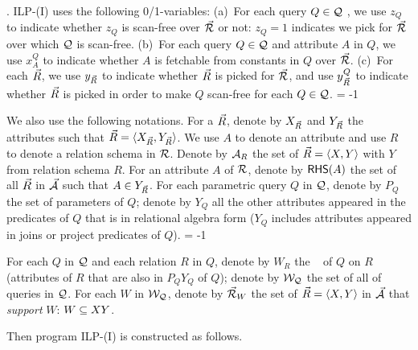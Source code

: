 {. 
ILP-(I) uses the following 0/1-variables: 
(a)~For each query $Q\in \mathcal Q$ , we use $z_{Q}$ to indicate whether
$z_{Q}$ is scan-free over $\vec{{\mathcal R}}$ or not:
$z_{Q} = 1$ indicates we pick \bss for $\vec{{\mathcal R}}$ over which $\mathcal Q$ is scan-free.
(b)~For each query $Q\in \mathcal Q$ and attribute $A$ in $Q$, we use
$x_{A}^{Q}$ to indicate whether $A$ is fetchable from constants
in $Q$ over $\vec{{\mathcal R}}$. 
(c)~For each \bs $\vec{R}$, we use $y_{\vec{R}}$ to indicate
whether $\vec{R}$ is picked for $\vec{{\mathcal R}}$, and use $y^{Q}_{\vec{R}}$ to
indicate whether $\vec{R}$ is picked in order to make $Q$ scan-free
for each $Q\in \mathcal Q$.
\looseness = -1

\vspace{0.4ex}
We also use the following notations. For a \bs $\vec{R}$,
denote by $X_{\vec{R}}$ and $Y_{\vec{R}}$ the attributes such that
$\vec{R}\allowbreak =\allowbreak  \langle X_{\vec{R}},\allowbreak Y_{\vec{R}}\rangle$.
We use $A$ to denote an attribute and use $R$ to denote a
relation schema in ${\mathcal R}$.
Denote by ${\mathcal A}_{R}$ the set of \bss $\vec{R} \allowbreak = \allowbreak
\langle X,\allowbreak Y\rangle$ with $Y$ from relation schema $R$. For an
attribute $A$ of ${\mathcal R}$, denote by ${\mathsf{RHS}}(A)$ the set of all \bss
$\vec{R}$ in $\vec{{\mathcal A}}$ such that $A\in Y_{\vec{R}}$.
%
For each parametric query $Q$ in $\mathcal Q$, denote by $P_{Q}$ the set
of parameters of $Q$; denote by $Y_{Q}$ all the other
attributes appeared in the predicates of $Q$ that is in relational
algebra form (\ie $Y_{Q}$ includes attributes appeared
in joins or project predicates of $Q$). 
\looseness = -1

For each $Q$ in $\mathcal Q$ and each relation $R$ in $Q$, denote by
$W_{R}$ the \qcs~\cite{blinkdb} of $Q$ on $R$ (\ie attributes of
$R$ that are also in $P_{Q}Y_{Q}$ of $Q$); denote by $\mathcal{W}_{\mathcal Q}$
the set of all \qcs of queries in $\mathcal Q$. For each \qcs $W$ in
$\mathcal{W}_{\mathcal Q}$, denote by $\vec{{\mathcal R}}_{W}$ the set of \bss $\vec{R}\allowbreak
=\allowbreak \langle X,\allowbreak Y\rangle$ in $\vec{{\mathcal A}}$ that {\em support} $W$: $W\allowbreak\subseteq\allowbreak XY$. 


Then program ILP-(I) is constructed as follows.

}
